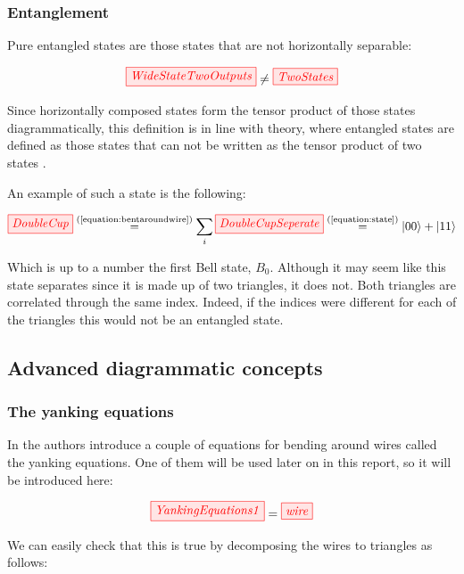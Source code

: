 \documentclass[]{article}
\newcommand{\equaltext}[1]{\ensuremath{\stackrel{\text{#1}}{=}}}
\begin{document}
\subsubsection{Entanglement}
\label{entanglement}
Pure entangled states are those states that are not horizontally separable: 

\begin{equation}
\tikzfig{WideStateTwoOutputs} \neq \tikzfig{TwoStates}
\end{equation}

Since horizontally composed states form the tensor product of those states diagrammatically, this definition is in line with theory, where entangled states are defined as those states that can not be written as the tensor product of two states \cite{Nielsen2011}. 

An example of such a state is the following:

\begin{equation}
\tikzfig{DoubleCup} \equaltext{(\ref{equation:bentaroundwire})} \sum\limits_{i} \tikzfig{DoubleCupSeperate} \equaltext{(\ref{equation:state})} \ket{00} + \ket{11}
\end{equation}

Which is up to a number the first Bell state, $B_0$. Although it may seem like this state separates since it is made up of two triangles, it does not. Both triangles are correlated through the same index. Indeed, if the indices were different for each of the triangles this would not be an entangled state.

\subsection{Advanced diagrammatic concepts}

\subsubsection{The yanking equations}

In \cite{Coecke2017} the authors introduce a couple of equations for bending around wires called the yanking equations. One of them will be used later on in this report, so it will be introduced here:

\begin{equation}
	\label{equation:yankingequation}
	\tikzfig{YankingEquations1} = \tikzfig{wire}
\end{equation}

We can easily check that this is true by decomposing the wires to triangles as follows:
\end{document}
